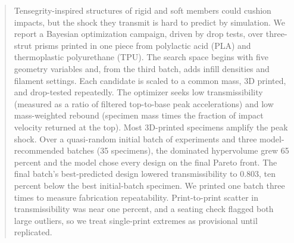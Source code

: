 \begin{abstract}
Tensegrity-inspired structures of rigid and soft members could cushion
impacts, but the shock they transmit is hard to predict by simulation.
We report a Bayesian optimization campaign, driven by drop tests, over
three-strut prisms printed in one piece from polylactic acid (PLA) and
thermoplastic polyurethane (TPU). The search space begins with five
geometry variables and, from the third batch, adds infill densities and
filament settings. Each candidate is scaled to a common mass,
3D printed, and drop-tested repeatedly. The optimizer seeks low
transmissibility (measured as a ratio of filtered top-to-base peak
accelerations) and low mass-weighted rebound (specimen mass times the
fraction of impact velocity returned at the top). Most 3D-printed
specimens amplify the peak shock. Over a quasi-random initial batch of
experiments and three model-recommended batches (35 specimens), the
dominated hypervolume grew 65 percent and the model chose every design
on the final Pareto front. The final batch's best-predicted design
lowered transmissibility to 0.803, ten percent below the best
initial-batch specimen. We printed one batch three times to measure
fabrication repeatability. Print-to-print scatter in transmissibility
was near one percent, and a seating check flagged both large outliers,
so we treat single-print extremes as provisional until replicated.
\end{abstract}
